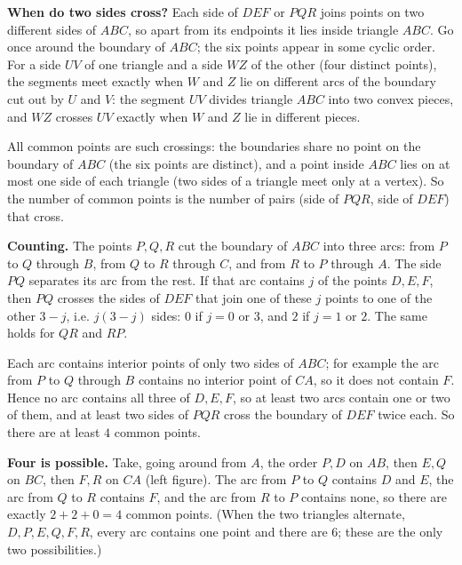 \textbf{When do two sides cross?} Each side of $DEF$ or $PQR$ joins points on two different sides of $ABC$, so apart from its endpoints it lies inside triangle $ABC$. Go once around the boundary of $ABC$; the six points appear in some cyclic order. For a side $UV$ of one triangle and a side $WZ$ of the other (four distinct points), the segments meet exactly when $W$ and $Z$ lie on different arcs of the boundary cut out by $U$ and $V$: the segment $UV$ divides triangle $ABC$ into two convex pieces, and $WZ$ crosses $UV$ exactly when $W$ and $Z$ lie in different pieces.

All common points are such crossings: the boundaries share no point on the boundary of $ABC$ (the six points are distinct), and a point inside $ABC$ lies on at most one side of each triangle (two sides of a triangle meet only at a vertex). So the number of common points is the number of pairs (side of $PQR$, side of $DEF$) that cross.

\textbf{Counting.} The points $P,Q,R$ cut the boundary of $ABC$ into three arcs: from $P$ to $Q$ through $B$, from $Q$ to $R$ through $C$, and from $R$ to $P$ through $A$. The side $PQ$ separates its arc from the rest. If that arc contains $j$ of the points $D,E,F$, then $PQ$ crosses the sides of $DEF$ that join one of these $j$ points to one of the other $3-j$, i.e. $j(3-j)$ sides: $0$ if $j=0$ or $3$, and $2$ if $j=1$ or $2$. The same holds for $QR$ and $RP$.

Each arc contains interior points of only two sides of $ABC$; for example the arc from $P$ to $Q$ through $B$ contains no interior point of $CA$, so it does not contain $F$. Hence no arc contains all three of $D,E,F$, so at least two arcs contain one or two of them, and at least two sides of $PQR$ cross the boundary of $DEF$ twice each. So there are at least $4$ common points.

\textbf{Four is possible.} Take, going around from $A$, the order $P,D$ on $AB$, then $E,Q$ on $BC$, then $F,R$ on $CA$ (left figure). The arc from $P$ to $Q$ contains $D$ and $E$, the arc from $Q$ to $R$ contains $F$, and the arc from $R$ to $P$ contains none, so there are exactly $2+2+0=4$ common points. (When the two triangles alternate, $D,P,E,Q,F,R$, every arc contains one point and there are $6$; these are the only two possibilities.)

